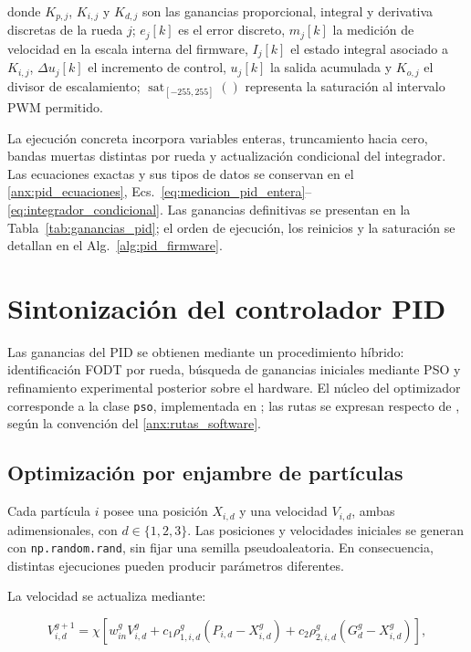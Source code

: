 \noindent donde $K_{p,j}$, $K_{i,j}$ y $K_{d,j}$ son las ganancias proporcional, integral y derivativa discretas de la rueda $j$; $e_j[k]$ es el error discreto, $m_j[k]$ la medición de velocidad en la escala interna del firmware, $I_j[k]$ el estado integral asociado a $K_{i,j}$, $\Delta u_j[k]$ el incremento de control, $u_j[k]$ la salida acumulada y $K_{o,j}$ el divisor de escalamiento; $\operatorname{sat}_{[-255,255]}()$ representa la saturación al intervalo PWM permitido.

La ejecución concreta incorpora variables enteras, truncamiento hacia cero,
bandas muertas distintas por rueda y actualización condicional del integrador.
Las ecuaciones exactas y sus tipos de datos se conservan en el
\ref{anx:pid_ecuaciones}, Ecs.~\eqref{eq:medicion_pid_entera}--
\eqref{eq:integrador_condicional}. Las ganancias definitivas se presentan en
la Tabla~\ref{tab:ganancias_pid}; el orden de ejecución, los reinicios y la
saturación se detallan en el Alg.~\ref{alg:pid_firmware}.

\section{Sintonización del controlador PID}
\label{sec:sintonizacion}

Las ganancias del PID se obtienen mediante un procedimiento híbrido: identificación FODT por rueda, búsqueda de ganancias iniciales mediante PSO y refinamiento experimental posterior sobre el hardware. El núcleo del optimizador corresponde a la clase \texttt{pso}, implementada en ; las rutas se expresan respecto de , según la convención del \ref{anx:rutas_software}.

\subsection{Optimización por enjambre de partículas}
\label{sec:pso_marco}

Cada partícula $i$ posee una posición $X_{i,d}$ y una velocidad $V_{i,d}$, ambas adimensionales, con $d\in\{1,2,3\}$. Las posiciones y velocidades iniciales se generan con \texttt{np.random.rand}, sin fijar una semilla pseudoaleatoria. En consecuencia, distintas ejecuciones pueden producir parámetros diferentes.

La velocidad se actualiza mediante:

\begin{equation}
V_{i,d}^{g+1}
=
\chi
\left[
w_{in}^{g}V_{i,d}^{g}
+c_1\rho_{1,i,d}^{g}
\left(P_{i,d}-X_{i,d}^{g}\right)
+c_2\rho_{2,i,d}^{g}
\left(G_d^{g}-X_{i,d}^{g}\right)
\right],
\label{eq:pso_vel_marco_teorico}
\end{equation}

